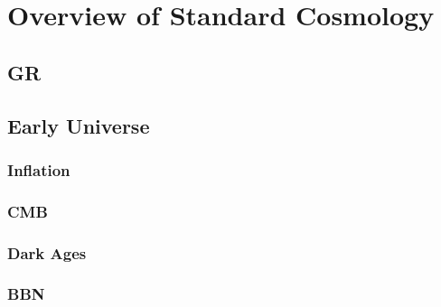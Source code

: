 
\chapter{Overview of Standard Cosmology} %

\label{Overview} %


\newcommand{\keyword}[1]{\textbf{#1}}
\newcommand{\tabhead}[1]{\textbf{#1}}
\newcommand{\code}[1]{\texttt{#1}}
\newcommand{\file}[1]{\texttt{\bfseries#1}}
\newcommand{\option}[1]{\texttt{\itshape#1}}


\section{GR}



\section{Early Universe}



\subsection{Inflation}



\subsection{CMB}



\subsection{Dark Ages}


\subsection{BBN}
 


